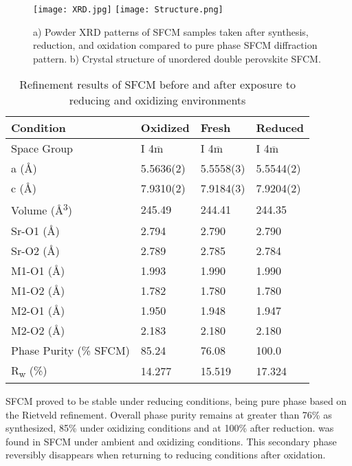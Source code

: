     \begin{figure}
      \texttt{[image: XRD.jpg]}
      \texttt{[image: Structure.png]}
      \caption{a) Powder XRD patterns of SFCM samples taken after synthesis, reduction, and oxidation compared to pure phase SFCM diffraction pattern. b) Crystal structure of unordered double perovskite SFCM. }
      \label{fig:structure}
    \end{figure}

    \begin{table}
        \centering
        \caption{Refinement results of SFCM before and after exposure to reducing and oxidizing environments}
        \label{tab:xrdrefine}
        \begin{tabular}{llll}
        Condition & Oxidized & Fresh   & Reduced  \\
        \hline
        Space Group                & I 4$\overline{\text{m}}$    & I 4$\overline{\text{m}}$   & I 4$\overline{\text{m}}$    \\
        a (\si{\angstrom})        & 5.5636(2)   & 5.5558(3)  & 5.5544(2)   \\
        c (\si{\angstrom})        & 7.9310(2)   & 7.9184(3)  & 7.9204(2)   \\
        Volume (\si{\angstrom\cubed}) & 245.49  & 244.41 & 244.35  \\
        Sr-O1 (\si{\angstrom})    & 2.794  & 2.790 & 2.790   \\
        Sr-O2 (\si{\angstrom})    & 2.789  & 2.785 & 2.784   \\
        M1-O1 (\si{\angstrom})    & 1.993  & 1.990 & 1.990   \\
        M1-O2 (\si{\angstrom})    & 1.782  & 1.780 & 1.780   \\
        M2-O1 (\si{\angstrom})    & 1.950  & 1.948 & 1.947   \\
        M2-O2 (\si{\angstrom})    & 2.183  & 2.180 & 2.180   \\
        Phase Purity (\% SFCM)    & 85.24  & 76.08 & 100.0   \\
        R\textsubscript{w} (\%)   & 14.277 & 15.519 & 17.324
        \end{tabular}
        \end{table}

    SFCM proved to be stable under reducing conditions, being pure phase based on the Rietveld refinement.
    Overall phase purity remains at greater than 76\% as synthesized, 85\% under oxidizing conditions and at 100\% after reduction.
     was found in SFCM under ambient and oxidizing conditions.
    This secondary phase reversibly disappears when returning to reducing conditions after oxidation.


